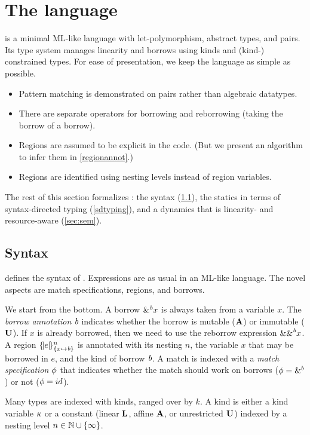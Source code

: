\section{The \lang language}

\lang is a minimal ML-like language with
let-polymorphism, abstract types, and pairs. Its type system manages
linearity and borrows using kinds and (kind-) constrained types.
For ease of presentation, we keep the language as simple as possible.
\begin{itemize}
\item Pattern matching is demonstrated on pairs rather than algebraic
  datatypes.
\item There are separate operators for borrowing and reborrowing (taking
  the borrow of a borrow).
\item Regions are assumed to be explicit in the code. (But we present
  an algorithm to infer them in \cref{regionannot}.)
\item Regions are identified using nesting levels instead of region
  variables.
\end{itemize}

The rest of this section formalizes  \lang: the syntax (\cref{syntax}),
the statics in terms of syntax-directed typing (\cref{sdtyping}),
and a dynamics that is linearity- and resource-aware (\cref{sec:sem}).

\subsection{Syntax}
\label{syntax}


 defines the syntax of \lang. Expressions are as usual
in an ML-like language.  The novel aspects are match
specifications, regions, and borrows.

We start from the bottom.
A borrow $\borrow{x}$ is always taken from a variable $x$. The
\emph{borrow annotation} $\BORROW$ indicates whether the borrow is mutable
($\MBORROW$) or immutable ($\IBORROW$). If $x$ is already borrowed,
then we need to use the reborrow expression $\reborrow{x}$.
%
A region $\region{\Sone x\BORROW}{e}$ is annotated with its nesting $n$, the variable $x$ that may be borrowed in $e$, and the kind of borrow $\BORROW$.
%
A match is indexed with a \emph{match specification} $\etransfm$ that indicates
whether the match should work on borrows ($\etransfm=\&^b$) or not ($\etransfm=id$).

Many types are indexed with kinds, ranged over by $k$.
A kind is either a kind variable $\kvar$ or a constant
(linear $\klin$, affine $\kaff$, or unrestricted $\kun$) indexed
by a nesting level $n \in \Nat \cup \{\infty\}$.

